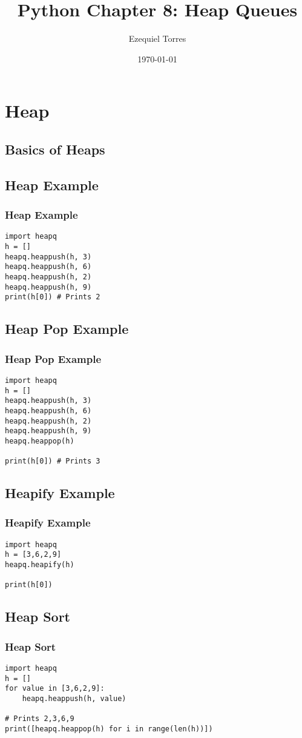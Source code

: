 \documentclass{beamer}
\begin{document}
\title{Python Chapter 8: Heap Queues}
\author{Ezequiel Torres}
\date{\today}
\frame{\titlepage}

\section{Heap}
\subsection{Basics of Heaps}


\begin{frame}[fragile]
\subsection{Heap Example}
\frametitle{Heap Example}
\begin{lstlisting}
import heapq
h = []
heapq.heappush(h, 3)
heapq.heappush(h, 6)
heapq.heappush(h, 2)
heapq.heappush(h, 9)
print(h[0]) # Prints 2
\end{lstlisting}
\end{frame}

\begin{frame}[fragile]
\subsection{Heap Pop Example}
\frametitle{Heap Pop Example}
\begin{lstlisting}
import heapq
h = []
heapq.heappush(h, 3)
heapq.heappush(h, 6)
heapq.heappush(h, 2)
heapq.heappush(h, 9)
heapq.heappop(h)

print(h[0]) # Prints 3
\end{lstlisting}
\end{frame}

\begin{frame}[fragile]
\subsection{Heapify Example}
\frametitle{Heapify Example}
\begin{lstlisting}
import heapq
h = [3,6,2,9]
heapq.heapify(h)

print(h[0])
\end{lstlisting}
\end{frame}

\begin{frame}[fragile]
\subsection{Heap Sort}
\frametitle{Heap Sort}
\begin{lstlisting}
import heapq
h = []
for value in [3,6,2,9]:
    heapq.heappush(h, value)

# Prints 2,3,6,9
print([heapq.heappop(h) for i in range(len(h))]) 
\end{lstlisting}
\end{frame}
\end{document}
